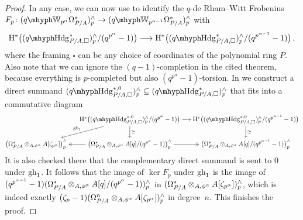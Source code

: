 \documentclass[DIV=12,numbers=enddot,leqno,bibliography=totoc]{scrartcl}
\begin{document}
\begin{proof}
		In any case, we can now use \cite[Theorem~]{qWitt} to identify the $q$-de Rham--Witt Frobenius $F_p\colon (\qIW_{p^\alpha}\Omega_{P/A}^*)_p^\complete\rightarrow (\qIW_{p^{\alpha-1}}\Omega_{P/A}^*)_p^\complete$ with
		\begin{equation*}
			\H^*\bigl((\qHodge_{P/A, \square}^*)_p^\complete/(q^{p^\alpha}-1)\bigr)\longrightarrow\H^*\bigl((\qHodge_{P/A, \square}^*)_p^\complete/(q^{p^{\alpha-1}}-1)\bigr)\,,
		\end{equation*}
		where the framing $\square$ can be any choice of coordinates of the polynomial ring $P$. Also note that we can ignore the $(q-1)$-completion in the cited theorem, because everything is $p$-completed but also $(q^{p^\alpha}-1)$-torsion. In \cite[--]{qWitt} we construct a direct summand
		$(\qHodge_{P/A, \square}^{*,0})_p^\complete\subseteq (\qHodge_{P/A, \square}^*)_p^\complete$ that fits into a commutative diagram
		\begin{equation*}
			\begin{tikzcd}[cramped]
				&[-1em] \H^*\bigl((\qHodge_{P/A, \square}^{*,0})_p^\complete/(q^{p^\alpha}-1)\bigr)\rar\dar["\cong"]\dlar["\gh_1"'] &[-1em]\H^*\bigl((\qHodge_{P/A, \square}^{*,0})_p^\complete/(q^{p^{\alpha-1}}-1)\bigr)\dar["\cong"]\\
				\bigl(\Omega_{P/A}^*\otimes_{A,\phi^\alpha}A[\zeta_{p^\alpha}]\bigr)_p^\complete & \bigl(\Omega_{P/A}^*\otimes_{A,\phi^\alpha}A[q]/(q^{p^\alpha}-1)\bigr)_p^\complete\lar[->>]\rar[->>] & \bigl(\Omega_{P/A}^*\otimes_{A,\phi^\alpha}A[q]/(q^{p^{\alpha-1}}-1)\bigr)_p^\complete
			\end{tikzcd}
		\end{equation*}
		It is also checked there that the complementary direct summand is sent to $0$ under $\operatorname{gh}_1$. It follows that the image of $\ker F_p$ under $\operatorname{gh}_1$ is the image of $(q^{p^{\alpha-1}}-1)(\Omega_{P/A}^*\otimes_{A,\phi^\alpha}A[q]/(q^{p^\alpha}-1))_p^\wedge$ in $(\Omega_{P/A}^*\otimes_{A,\phi^\alpha}A[\zeta_{p^\alpha}])_p^\wedge$, which is indeed exactly $(\zeta_p-1)(\Omega_{P/A}^n\otimes_{A,\phi^\alpha}A[\zeta_{p^\alpha}])_p^\wedge$ in degree~$n$. This finishes the proof.
	\end{proof}
\end{document}

